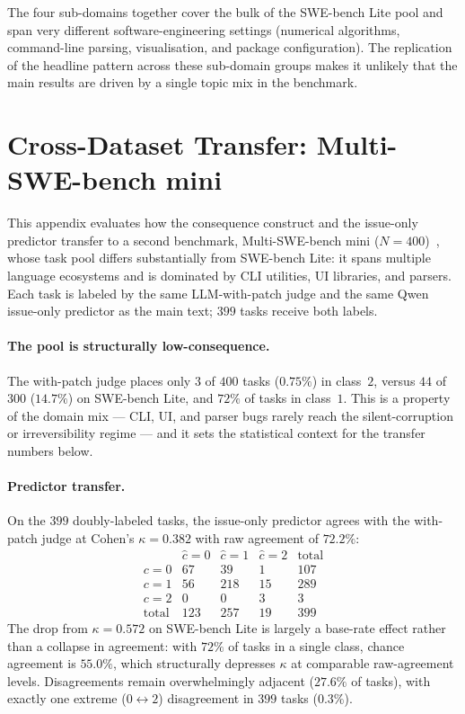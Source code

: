 \documentclass{article}
\begin{document}
The four sub-domains together cover the bulk of the SWE-bench Lite
pool and span very different software-engineering settings (numerical
algorithms, command-line parsing, visualisation, and package
configuration). The replication of the headline pattern across these sub-domain groups
makes it unlikely that the main results are driven by a single topic
mix in the benchmark.

\section{Cross-Dataset Transfer: Multi-SWE-bench mini}
\label{app:crossdataset}

This appendix evaluates how the consequence construct and the
issue-only predictor transfer to a second benchmark, Multi-SWE-bench
mini ($N{=}400$)~\citep{ma2024multiswebench}, whose task pool differs
substantially from SWE-bench Lite: it spans multiple language
ecosystems and is dominated by CLI utilities, UI libraries, and
parsers. Each task is labeled by the same LLM-with-patch judge and
the same Qwen issue-only predictor as the main text; $399$ tasks
receive both labels.

\paragraph{The pool is structurally low-consequence.} The with-patch
judge places only $3$ of $400$ tasks ($0.75\%$) in class~$2$, versus
$44$ of $300$ ($14.7\%$) on SWE-bench Lite, and $72\%$ of tasks in
class~$1$. This is a property of the domain mix --- CLI, UI, and
parser bugs rarely reach the silent-corruption or irreversibility
regime --- and it sets the statistical context for the transfer
numbers below.

\paragraph{Predictor transfer.} On the $399$ doubly-labeled tasks,
the issue-only predictor agrees with the with-patch judge at Cohen's
$\kappa = 0.382$ with raw agreement of $72.2\%$:
\[
\begin{array}{c|ccc|c}
& \hat{c}{=}0 & \hat{c}{=}1 & \hat{c}{=}2 & \text{total} \\\hline
c{=}0 & 67 & 39 & 1  & 107 \\
c{=}1 & 56 & 218 & 15 & 289 \\
c{=}2 & 0  & 0   & 3  & 3   \\\hline
\text{total} & 123 & 257 & 19 & 399
\end{array}
\]
The drop from $\kappa = 0.572$ on SWE-bench Lite is largely a
base-rate effect rather than a collapse in agreement: with $72\%$ of
tasks in a single class, chance agreement is $55.0\%$, which
structurally depresses $\kappa$ at comparable raw-agreement levels.
Disagreements remain overwhelmingly adjacent ($27.6\%$ of tasks),
with exactly one extreme ($0{\leftrightarrow}2$) disagreement in
$399$ tasks ($0.3\%$).
\end{document}
